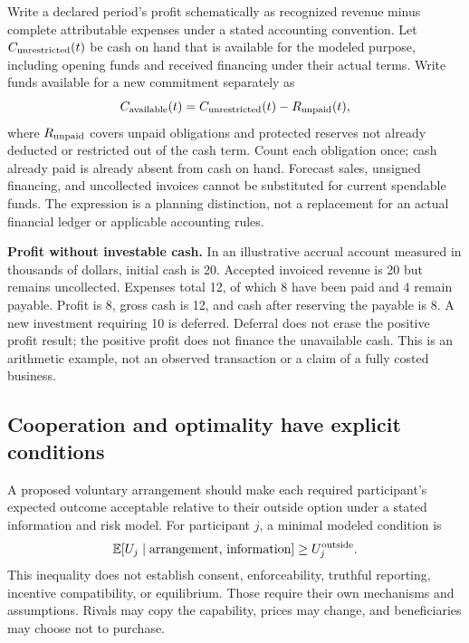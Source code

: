 \documentclass[11pt,letterpaper]{article}
\theoremstyle{remark}\newtheorem{remark}{Remark}[section]
\begin{document}
Write a declared period's profit schematically as recognized revenue minus complete attributable expenses under a stated accounting convention.
Let $C_{\rm unrestricted}(t)$ be cash on hand that is available for the modeled purpose, including opening funds and received financing under their actual terms.
Write funds available for a new commitment separately as
\begin{equation}
 C_{\rm available}(t)=C_{\rm unrestricted}(t)-R_{\rm unpaid}(t),
\end{equation}
where $R_{\rm unpaid}$ covers unpaid obligations and protected reserves not already deducted or restricted out of the cash term.
Count each obligation once; cash already paid is already absent from cash on hand.
Forecast sales, unsigned financing, and uncollected invoices cannot be substituted for current spendable funds.
The expression is a planning distinction, not a replacement for an actual financial ledger or applicable accounting rules.

\textbf{Profit without investable cash.}
In an illustrative accrual account measured in thousands of dollars, initial cash is 20.
Accepted invoiced revenue is 20 but remains uncollected.
Expenses total 12, of which 8 have been paid and 4 remain payable.
Profit is 8, gross cash is 12, and cash after reserving the payable is 8.
A new investment requiring 10 is deferred.
Deferral does not erase the positive profit result; the positive profit does not finance the unavailable cash.
This is an arithmetic example, not an observed transaction or a claim of a fully costed business.

\subsection{Cooperation and optimality have explicit conditions}
A proposed voluntary arrangement should make each required participant's expected outcome acceptable relative to their outside option under a stated information and risk model.
For participant $j$, a minimal modeled condition is
\begin{equation}
 \mathbb E[U_j\mid \text{arrangement, information}]
 \ge U_j^{\rm outside}.
\end{equation}
This inequality does not establish consent, enforceability, truthful reporting, incentive compatibility, or equilibrium.
Those require their own mechanisms and assumptions.
Rivals may copy the capability, prices may change, and beneficiaries may choose not to purchase.
\end{document}
